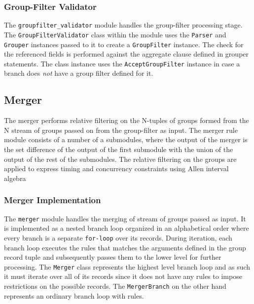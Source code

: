 \subsubsection{Group-Filter Validator}\label{subsubsec:group-filter-validator}
The \texttt{groupfilter\_validator} module handles the group-filter processing stage. The \texttt{GroupFilterValidator} class within the module uses the \texttt{Parser} and \texttt{Grouper} instances passed to it to create a \texttt{GroupFilter} instance. The check for the referenced fields is performed against the aggregate clause defined in grouper statements. The class instance uses the \texttt{AcceptGroupFilter} instance in case a branch does \emph{not} have a group filter defined for it.

\subsection{Merger}\label{subsec:merger}
The merger performs relative filtering on the N-tuples of groups formed from the N stream of groups passed on from the group-filter as input. The merger rule module consists of a number of a submodules, where the output of the merger is the set difference of the output of the first submodule with the union of the output of the rest of the submodules. The relative filtering on the groups are applied to express timing and concurrency constraints using Allen interval algebra \cite{fallen:1983}

\subsubsection{Merger Implementation}\label{subsubsec:merger-impl}
The \texttt{merger} module handles the merging of stream of groups passed as input. It is implemented as a nested branch loop organized in an alphabetical order where every branch is a separate \texttt{for-loop} over its records. During iteration, each branch loop executes the rules that matches the arguments defined in the group record tuple and subsequently passes them to the lower level for further processing. The \texttt{Merger} class represents the highest level branch loop and as such it must iterate over all of its records since it does not have any rules to impose restrictions on the possible records. The \texttt{MergerBranch} on the other hand represents an ordinary branch loop with rules.

